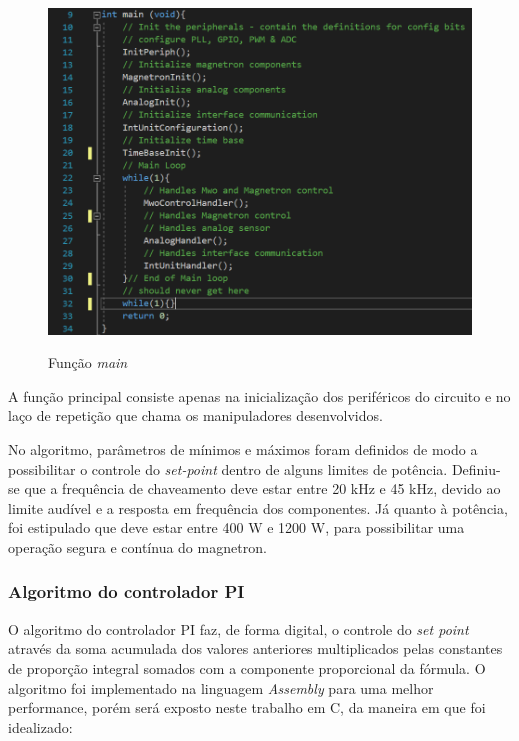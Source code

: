 \begin{figure}[H]
    \centering
    \caption{Função \textit{main}}
    \includegraphics[width=1\textwidth]{./dados/figuras/func_main}
    \label{fig:figura-func-main}
\end{figure}

A função principal consiste apenas na inicialização dos periféricos do circuito e no laço de repetição que chama os manipuladores desenvolvidos.

No algoritmo, parâmetros de mínimos e máximos foram definidos de modo a possibilitar o controle do \textit{set-point} dentro de alguns limites de potência. Definiu-se que a frequência de chaveamento deve estar entre 20 kHz e 45 kHz, devido ao limite audível e a resposta em frequência dos componentes. Já quanto à potência, foi estipulado que deve estar entre 400 W e 1200 W, para possibilitar uma operação segura e contínua do magnetron.

\subsubsection{Algoritmo do controlador PI}
O algoritmo do controlador PI faz, de forma digital, o controle do \textit{set point} através da soma acumulada dos valores anteriores multiplicados pelas constantes de proporção integral somados com a componente proporcional da fórmula. O algoritmo foi implementado na linguagem \textit{Assembly} para uma melhor performance, porém será exposto neste trabalho em C, da maneira em que foi idealizado:

